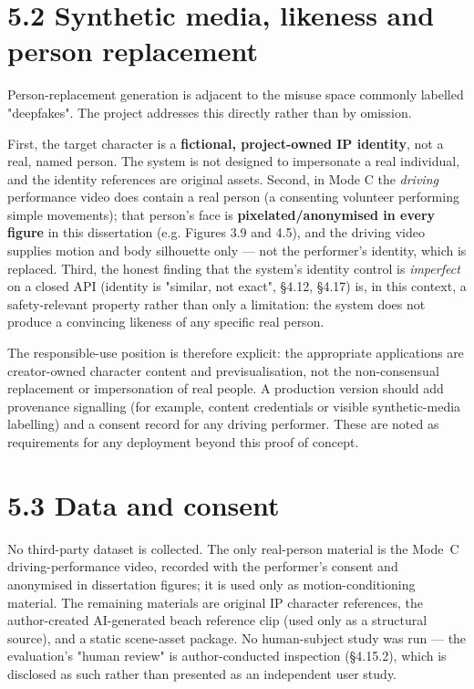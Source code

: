 \documentclass[10pt,twocolumn,letterpaper]{article}
\begin{document}

\section*{5.2 Synthetic media, likeness and person replacement}

Person-replacement generation is adjacent to the misuse space commonly labelled "deepfakes". The project addresses this directly rather than by omission.

First, the target character is a \textbf{fictional, project-owned IP identity}, not a real, named person. The system is not designed to impersonate a real individual, and the identity references are original assets. Second, in Mode C the \emph{driving} performance video does contain a real person (a consenting volunteer performing simple movements); that person's face is \textbf{pixelated/anonymised in every figure} in this dissertation (e.g. Figures 3.9 and 4.5), and the driving video supplies motion and body silhouette only --- not the performer's identity, which is replaced. Third, the honest finding that the system's identity control is \emph{imperfect} on a closed API (identity is "similar, not exact", \S{}4.12, \S{}4.17) is, in this context, a safety-relevant property rather than only a limitation: the system does not produce a convincing likeness of any specific real person.

The responsible-use position is therefore explicit: the appropriate applications are creator-owned character content and previsualisation, not the non-consensual replacement or impersonation of real people. A production version should add provenance signalling (for example, content credentials or visible synthetic-media labelling) and a consent record for any driving performer. These are noted as requirements for any deployment beyond this proof of concept.


\section*{5.3 Data and consent}

No third-party dataset is collected. The only real-person material is the Mode~C driving-performance video, recorded with the performer's consent and anonymised in dissertation figures; it is used only as motion-conditioning material. The remaining materials are original IP character references, the author-created AI-generated beach reference clip (used only as a structural source), and a static scene-asset package. No human-subject study was run --- the evaluation's "human review" is author-conducted inspection (\S{}4.15.2), which is disclosed as such rather than presented as an independent user study.
\end{document}
